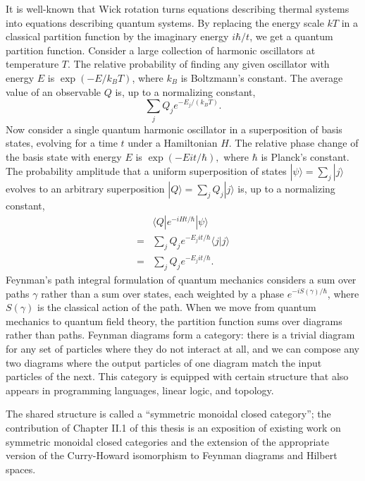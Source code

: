 \documentclass[12pt,twoside,openright]{report}
\begin{document}
It is well-known that Wick rotation turns equations describing thermal systems into equations describing quantum systems.  By replacing the energy scale $kT$ in a classical partition function by the imaginary energy $i\hbar/t$, we get a quantum partition function.  Consider a large collection of harmonic oscillators at temperature $T$.  The relative probability of finding any given oscillator with energy $E$ is $\exp(-E/k_B T)$, where $k_B$ is Boltzmann's constant. The average value of an observable $Q$ is, up to a normalizing constant,
\[ \sum_j Q_j e^{-E_j / (k_B T)}.\]
Now consider a single quantum harmonic oscillator in a superposition of basis states, evolving for a time $t$ under a Hamiltonian $H$. The relative phase change of the basis state with energy $E$ is $\exp(-E it/ \hbar),$ where $\hbar$ is Planck's constant. The probability amplitude that a uniform superposition of states $|\psi\rangle = \sum_j |j\rangle$ evolves to an arbitrary superposition $|Q\rangle = \sum_j Q_j |j\rangle$ is, up to a normalizing constant,
\begin{align*}
   & \langle Q|e^{-iHt/\hbar}|\psi\rangle \\
  = & \sum_j Q_j e^{-E_j it/ \hbar}\langle j|j\rangle \\
  = & \sum_j Q_j e^{-E_j it/ \hbar}.
\end{align*}
Feynman's path integral formulation of quantum mechanics considers a sum over paths $\gamma$ rather than a sum over states, each weighted by a phase $e^{-iS(\gamma)/\hbar}$, where $S(\gamma)$ is the classical action of the path.  When we move from quantum mechanics to quantum field theory, the partition function sums over diagrams rather than paths.  Feynman diagrams form a category: there is a trivial diagram for any set of particles where they do not interact at all, and we can compose any two diagrams where the output particles of one diagram match the input particles of the next.  This category is equipped with certain structure that also appears in programming languages, linear logic, and topology.  

The shared structure is called a ``symmetric monoidal closed category''; the contribution of Chapter II.1 of this thesis is an exposition of existing work on symmetric monoidal closed categories and the extension of the appropriate version of the Curry-Howard isomorphism to Feynman diagrams and Hilbert spaces.  
\end{document}
